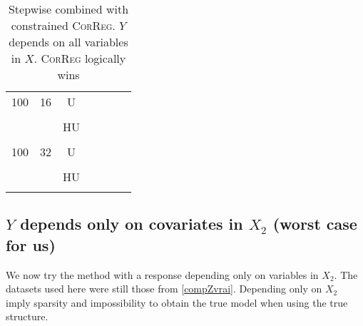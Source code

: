 \documentclass[11pt,a4paper]{article}
\begin{document}
\begin{table}[h!]
\begin{tabular}{|c|c|c|c|c|c|c|}
& & &  \\
\hline %
100 & 16 & U&  \\
& & &  \\
 &  &HU &  \\
& & & \\
\hline %
100 & 32 & U&  \\
& & &  \\
 &  &HU &  \\
& & & \\
\hline
\end{tabular} 
\caption{Stepwise  combined with constrained \textsc{CorReg}. $Y$ depends on all variables in $X$. \textsc{CorReg} logically wins}\label{YXlinstep}
\end{table}



\clearpage
	\subsection{$Y$ depends only on covariates in $X_2$ (worst case for us)}	 \label{tableMSEsimgauche}
We now try the method with a response depending only on variables in $X_2$. The datasets used here were still those from \ref{compZvrai}.
Depending only on $X_2$ imply sparsity and impossibility to obtain the true model when using the true structure. 
\end{document}
